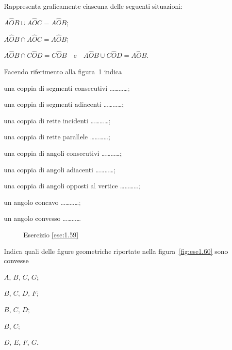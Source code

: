 \begin{esercizio}
\label{ese:1.58}
Rappresenta graficamente ciascuna delle seguenti situazioni:
\begin{enumeratea}
\item \(A\widehat{O}B\cup A\widehat{O}C=A\widehat{O}B\);
\item \(A\widehat{O}B\cap A\widehat{O}C=A\widehat{O}B\);
\item \(A\widehat{O}B\cap 
C\widehat{O}D=C\widehat{O}B\)~~e~~\(A\widehat{O}B\cup 
C\widehat{O}D=A\widehat{O}B\).
\end{enumeratea}
\end{esercizio}

\begin{esercizio}
\label{ese:1.59}
Facendo riferimento alla figura~\ref{fig:ese1.59} indica
\begin{enumeratea}
\item una coppia di segmenti consecutivi \ldots\ldots\ldots\ldots{};
\item una coppia di segmenti adiacenti \ldots\ldots\ldots\ldots{};
\item una coppia di rette incidenti \ldots\ldots\ldots\ldots{};
\item una coppia di rette parallele \ldots\ldots\ldots\ldots{};
\item una coppia di angoli consecutivi \ldots\ldots\ldots\ldots{};
\item una coppia di angoli adiacenti \ldots\ldots\ldots\ldots{};
\item una coppia di angoli opposti al vertice 
\ldots\ldots\ldots\ldots{};
\item un angolo concavo \ldots\ldots\ldots\ldots{};
\item un angolo convesso \ldots\ldots\ldots\ldots{}
\end{enumeratea}
\end{esercizio}


\begin{inaccessibleblock}
 \begin{figure}[htb]
 \centering
 \caption{Esercizio \ref{ese:1.59}}\label{fig:ese1.59}
\end{figure}
\end{inaccessibleblock}

\begin{esercizio}
\label{ese:1.60}
Indica quali delle figure geometriche riportate nella 
figura~\ref{fig:ese1.60} sono convesse
\begin{multicols}{5}
\begin{enumeratea}
\item \(A\), \(B\), \(C\), \(G\);
\item \(B\), \(C\), \(D\), \(F\);
\item \(B\), \(C\), \(D\);
\item \(B\), \(C\);
\item \(D\), \(E\), \(F\), \(G\).
\end{enumeratea}
\end{multicols}
\end{esercizio}


